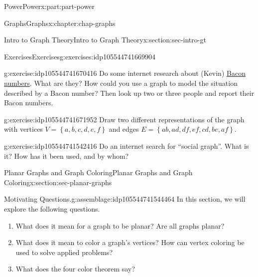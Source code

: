 \documentclass[oneside,10pt,]{book}
\numberwithin{equation}{section}
\newcommand{\set}[1]{\left\{ {#1} \right\}}
\begin{document}
\begin{partptx}{Power}{}{Power}{}{}{x:part:part-power}
\begin{chapterptx}{Graphs}{}{Graphs}{}{}{x:chapter:chap-graphs}
\begin{sectionptx}{Intro to Graph Theory}{}{Intro to Graph Theory}{}{}{x:section:sec-intro-gt}
\typeout{************************************************}
%
\begin{exercises-subsection}{Exercises}{}{Exercises}{}{}{g:exercises:idp105544741669904}
\begin{divisionexercise}{1}{}{}{g:exercise:idp105544741670416}%
Do some internet research about (Kevin) \href{https://www.oracleofbacon.org}{Bacon numbers}\footnotemark{}. What are they? How could you use a graph to model the situation described by a Bacon number? Then look up two or three people and report their Bacon numbers.%
\end{divisionexercise}%
%
\begin{divisionexercise}{2}{}{}{g:exercise:idp105544741671952}%
Draw two different representations of the graph with vertices \(V = \set{a,b,c,d,e,f}\) and edges \(E = \set{ab,ad,df,ef,cd,be,af}\).%
\end{divisionexercise}%
\begin{divisionexercise}{3}{}{}{g:exercise:idp105544741542416}%
Do an internet search for ``social graph''. What is it? How has it been used, and by whom?%
\end{divisionexercise}%
\end{exercises-subsection}
\end{sectionptx}
%
%
\typeout{************************************************}
\typeout{************************************************}
%
\begin{sectionptx}{Planar Graphs and Graph Coloring}{}{Planar Graphs and Graph Coloring}{}{}{x:section:sec-planar-graphs}
\begin{assemblage}{Motivating Questions.}{g:assemblage:idp105544741544464}%
In this section, we will explore the following questions. %
\begin{enumerate}
\item{}What does it mean for a graph to be planar? Are all graphs planar?%
\item{}What does it mean to color a graph's vertices? How can vertex coloring be used to solve applied problems?%
\item{}What does the four color theorem say?%
\end{enumerate}
%
\end{assemblage}
%
%
\typeout{************************************************}
\typeout{************************************************}

\end{sectionptx}
\end{chapterptx}
\end{partptx}
\end{document}

